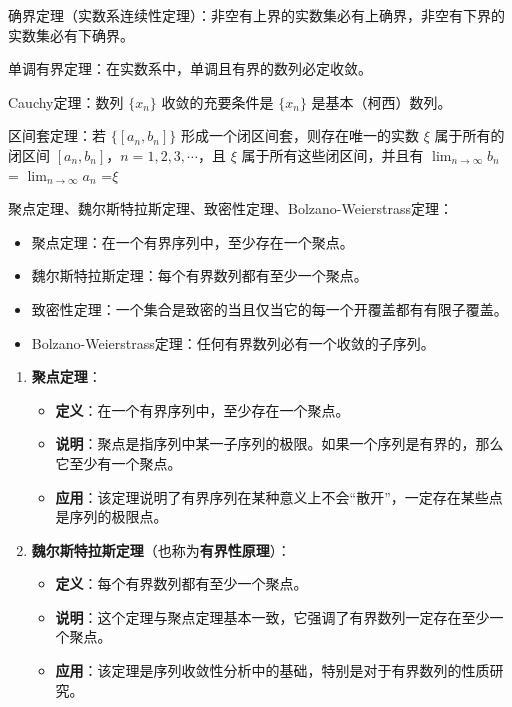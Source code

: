 \documentclass[12pt, a4paper, oneside, UTF8]{ctexbook}
\begin{document}
\begin{change}
	\item 确界定理（实数系连续性定理\label{def:int1}）：非空有上界的实数集必有上确界，非空有下界的实数集必有下确界。
	\item 单调有界定理：在实数系中，单调且有界的数列必定收敛。
	\item Cauchy定理：数列 \(\{x_n\}\) 收敛的充要条件是 \(\{x_n\}\) 是基本（柯西）数列。
	\item 区间套定理：若 \(\{[a_n, b_n]\}\) 形成一个闭区间套，则存在唯一的实数 \(\xi\) 属于所有的闭区间 \([a_n, b_n]\)，\(n = 1, 2, 3, \cdots\)，且 \( \xi \) 属于所有这些闭区间，并且有 \( \lim_{n \to \infty} b_n \) = \( \lim_{n \to \infty} a_n  \) =\( \xi \) 
	\item 聚点定理、魏尔斯特拉斯定理、致密性定理、Bolzano-Weierstrass定理：
	\begin{itemize}
		\item 聚点定理：在一个有界序列中，至少存在一个聚点。
		\item 魏尔斯特拉斯定理：每个有界数列都有至少一个聚点。
		\item 致密性定理：一个集合是致密的当且仅当它的每一个开覆盖都有有限子覆盖。
		\item Bolzano-Weierstrass定理：任何有界数列必有一个收敛的子序列。
	\end{itemize}
	\begin{enumerate}
		\item \textbf{聚点定理}：
		\begin{itemize}
			\item \textbf{定义}：在一个有界序列中，至少存在一个聚点。
			\item \textbf{说明}：聚点是指序列中某一子序列的极限。如果一个序列是有界的，那么它至少有一个聚点。
			\item \textbf{应用}：该定理说明了有界序列在某种意义上不会“散开”，一定存在某些点是序列的极限点。
		\end{itemize}
		
		\item \textbf{魏尔斯特拉斯定理}（也称为\textbf{有界性原理}）：
		\begin{itemize}
			\item \textbf{定义}：每个有界数列都有至少一个聚点。
			\item \textbf{说明}：这个定理与聚点定理基本一致，它强调了有界数列一定存在至少一个聚点。
			\item \textbf{应用}：该定理是序列收敛性分析中的基础，特别是对于有界数列的性质研究。
		\end{itemize}
		

\end{enumerate}
\end{change}
\end{document}
